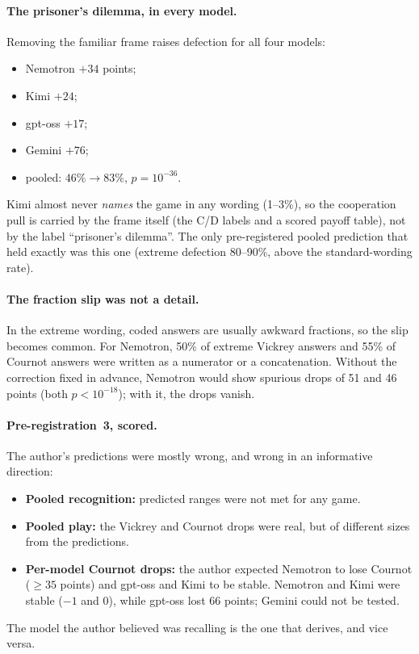 \documentclass[11pt]{article}
\theoremstyle{definition}
\theoremstyle{remark}
\begin{document}
\paragraph{The prisoner's dilemma, in every model.} Removing the familiar frame raises defection
for all four models:
\begin{itemize}
\item Nemotron $+34$ points;
\item Kimi $+24$;
\item gpt-oss $+17$;
\item Gemini $+76$;
\item pooled: $46\%\to83\%$, $p=10^{-36}$.
\end{itemize}
Kimi almost never \emph{names} the game in any wording (1--3\%), so the cooperation pull is
carried by the frame itself (the C/D labels and a scored payoff table), not by the label
``prisoner's dilemma''. The only pre-registered pooled prediction that held exactly was this one
(extreme defection 80--90\%, above the standard-wording rate).

\paragraph{The fraction slip was not a detail.} In the extreme wording, coded answers are usually
awkward fractions, so the slip becomes common. For Nemotron, 50\% of extreme Vickrey answers and
55\% of Cournot answers were written as a numerator or a concatenation. Without the correction
fixed in advance, Nemotron would show spurious drops of 51 and 46 points (both $p<10^{-18}$);
with it, the drops vanish.

\paragraph{Pre-registration~3, scored.} The author's predictions were mostly wrong, and wrong in
an informative direction:
\begin{itemize}
\item \textbf{Pooled recognition:} predicted ranges were not met for any game.
\item \textbf{Pooled play:} the Vickrey and Cournot drops were real, but of different sizes from
  the predictions.
\item \textbf{Per-model Cournot drops:} the author expected Nemotron to lose Cournot ($\ge35$
  points) and gpt-oss and Kimi to be stable. Nemotron and Kimi were stable ($-1$ and $0$), while
  gpt-oss lost 66 points; Gemini could not be tested.
\end{itemize}
The model the author believed was recalling is the one that derives, and vice versa.
\end{document}
